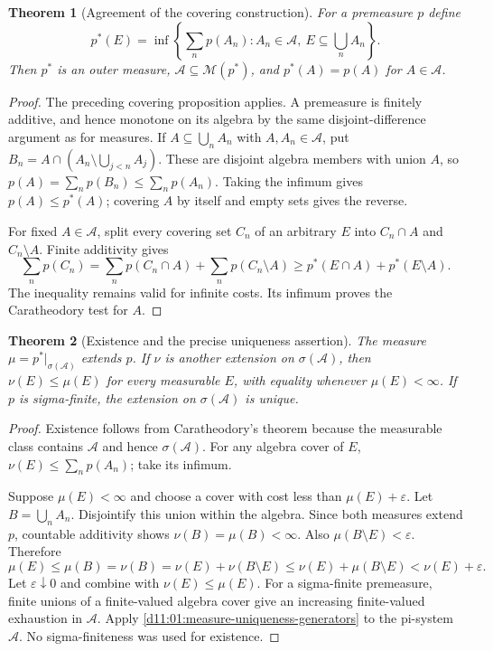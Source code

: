 \documentclass[11pt,oneside,openany]{book}
\newtheorem{theorem}{Theorem}[chapter]
\theoremstyle{definition}
\theoremstyle{remark}
\newcommand{\eps}{\varepsilon}\newcommand{\ee}{\varepsilon}
\newcommand{\calA}{\mathcal A}\newcommand{\LL}{\mathcal L}
\newcommand{\family}[1]{}
\begin{document}
\begin{theorem}[Agreement of the covering construction]
\family{D11.02.premeasure_outer_agreement}\label{d11:02:premeasure-outer-agreement}
For a premeasure $p$ define
\[
 p^*(E)=\inf\left\{\sum_n p(A_n): A_n\in\calA,
                               \ E\subseteq\bigcup_nA_n\right\}.
\]
Then $p^*$ is an outer measure, $\calA\subseteq\mathcal M(p^*)$, and
$p^*(A)=p(A)$ for $A\in\calA$.
\end{theorem}
\begin{proof}
The preceding covering proposition applies. A premeasure is finitely additive,
and hence monotone on its algebra by the same disjoint-difference argument as
for measures. If $A\subseteq\bigcup_n A_n$ with $A,A_n\in\calA$, put
$B_n=A\cap(A_n\setminus\bigcup_{j<n}A_j)$. These are disjoint algebra
members with union $A$, so
$p(A)=\sum_np(B_n)\leq\sum_np(A_n)$. Taking the infimum gives
$p(A)\leq p^*(A)$; covering $A$ by itself and empty sets gives the reverse.

For fixed $A\in\calA$, split every covering set $C_n$ of an arbitrary $E$
into $C_n\cap A$ and $C_n\setminus A$. Finite additivity gives
\[
 \sum_n p(C_n)=\sum_n p(C_n\cap A)+\sum_n p(C_n\setminus A)
 \geq p^*(E\cap A)+p^*(E\setminus A).
\]
The inequality remains valid for infinite costs. Its infimum proves the
Caratheodory test for $A$.
\end{proof}

\begin{theorem}[Existence and the precise uniqueness assertion]
\family{D11.02.extension_existence_uniqueness}\label{d11:02:extension-existence-uniqueness}
The measure $\mu=p^*|_{\sigma(\calA)}$ extends $p$. If $\nu$ is another
extension on $\sigma(\calA)$, then $\nu(E)\leq\mu(E)$ for every measurable
$E$, with equality whenever $\mu(E)<\infty$. If $p$ is sigma-finite, the
extension on $\sigma(\calA)$ is unique.
\end{theorem}
\begin{proof}
Existence follows from Caratheodory's theorem because the measurable class
contains $\calA$ and hence $\sigma(\calA)$. For any algebra cover of $E$,
$\nu(E)\leq\sum_np(A_n)$; take its infimum.

Suppose $\mu(E)<\infty$ and choose a cover with cost less than
$\mu(E)+\eps$. Let $B=\bigcup_nA_n$. Disjointify this union within the
algebra. Since both measures extend $p$, countable additivity shows
$\nu(B)=\mu(B)<\infty$. Also $\mu(B\setminus E)<\eps$. Therefore
\[
 \mu(E)\leq\mu(B)=\nu(B)=\nu(E)+\nu(B\setminus E)
 \leq\nu(E)+\mu(B\setminus E)<\nu(E)+\eps.
\]
Let $\eps\downarrow0$ and combine with $\nu(E)\leq\mu(E)$.
For a sigma-finite premeasure, finite unions of a finite-valued algebra cover
give an increasing finite-valued exhaustion in $\calA$. Apply
\cref{d11:01:measure-uniqueness-generators} to the pi-system $\calA$.
No sigma-finiteness was used for existence.
\end{proof}
\end{document}
